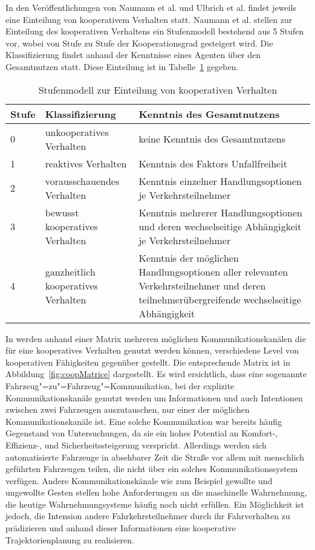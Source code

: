 In den Ver\"offentlichungen von Naumann et al. \cite{Naumann2017} und Ulbrich et al. \cite{Ulbrich2015} findet jeweils eine Einteilung von kooperativem Verhalten statt. 
Naumann et al. stellen zur Einteilung des kooperativen Verhaltens ein Stufenmodell bestehend aus 5 Stufen vor, wobei von Stufe zu Stufe der Kooperationsgrad gesteigert wird. 
Die Klassifizierung findet anhand der Kenntnisse eines Agenten \"uber den Gesamtnutzen statt. 
Diese Einteilung ist in Tabelle~\ref{tab:koopStufenmodell} gegeben.

\begin{table}
  \centering
  \begin{tabular}{l p{5cm} p{8cm}}
  \hline
  Stufe& Klassifizierung 					& Kenntnis des Gesamtnutzens \\
  \hline
  0   	& unkooperatives Verhalten           		& keine Kenntnis des Gesamtnutzens \\
  1 	& reaktives Verhalten                      		& Kenntnis des Faktors Unfallfreiheit \\
  2 	& vorausschauendes Verhalten 		& Kenntnis einzelner Handlungsoptionen je Verkehrsteilnehmer \\
  3     	& bewusst kooperatives Verhalten 		& Kenntnis mehrerer Handlungsoptionen und deren wechselseitige Abh\"angigkeit je Verkehrsteilnehmer  \\
  4 	& ganzheitlich kooperatives Verhalten	& Kenntnis der m\"oglichen Handlungsoptionen aller relevanten Verkehrsteilnehmer und deren teilnehmer\"ubergreifende wechselseitige Abh\"angigkeit \\
  \hline
  \end{tabular}
  \caption[Kooperatives Stufenmodell]{Stufenmodell zur Einteilung von kooperativen Verhalten \cite{Naumann2017}}
  \label{tab:koopStufenmodell}
\end{table}

In \cite{Ulbrich2015} werden anhand einer Matrix mehreren m\"oglichen Kommunikationskan\"alen die f\"ur eine kooperatives Verhalten genutzt werden k\"onnen, verschiedene Level von kooperativen F\"ahigkeiten gegen\"uber gestellt. Die entsprechende Matrix ist in Abbildung~\ref{fig:coopMatrice} dargestellt.
Es wird ersichtlich, dass eine sogenannte Fahrzeug"=zu"=Fahrzeug"=Kommunikation, bei der explizite Kommunikationskan\"ale genutzt werden um Informationen und auch Intentionen zwischen zwei Fahrzeugen auszutauschen, nur einer der m\"oglichen Kommunikationskan\"ale ist. 
Eine solche Kommunikation war bereits h\"aufig Gegenstand von Untersuchungen, da sie ein hohes Potential an Komfort-, Effizienz-, und Sicherheitssteigerung verspricht. 
Allerdings werden sich automatisierte Fahrzeuge in absehbarer Zeit die Stra{\ss}e vor allem mit menschlich gef\"uhrten Fahrzeugen teilen, die nicht \"uber ein solches Kommunikationssystem verf\"ugen.
Andere Kommunikationsk\"anale wie zum Beispiel gewollte und ungewollte Gesten stellen hohe Anforderungen an die maschinelle Wahrnehmung, die heutige Wahrnehmungsysteme h\"aufig noch nicht erf\"ullen. 
Ein M\"oglichkeit ist jedoch, die Intension andere Fahrkehrsteilnehmer durch ihr Fahrverhalten zu pr\"adizieren und anhand dieser Informationen eine kooperative Trajektorienplanung zu realisieren. \cite{Ulbrich2015}

